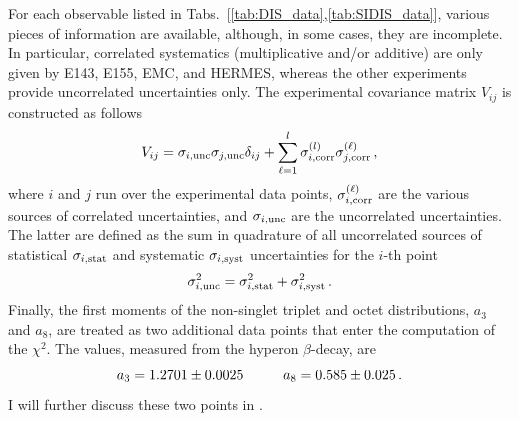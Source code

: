 For each observable listed in Tabs.~[\ref{tab:DIS_data},\ref{tab:SIDIS_data}], various pieces of information are available, although, in some cases, they are incomplete. In particular, correlated systematics (multiplicative and/or additive) are only given by E143, E155, EMC, and HERMES, whereas the other experiments provide uncorrelated uncertainties only. The experimental covariance matrix $V_{ij}$ is constructed as follows
\begin{equation}
  V_{ij} =  \sigma_{i,\textrm{unc}} \sigma_{j,\textrm{unc}} \delta_{ij} + \sum_{\ell=1}^{l} \sigma_{i,\textrm{corr}}^{(l)} \sigma_{j,\textrm{corr}}^{(\ell)} \,,
  \label{eq:covariance_matrix}
\end{equation}
where $i$ and $j$ run over the experimental data points, $\sigma_{i,\textrm{corr}}^{(\ell)}$ are the various sources of correlated uncertainties, and $\sigma_{i,\textrm{unc}}$ are the uncorrelated uncertainties. The latter are defined as the sum in quadrature of all uncorrelated sources of statistical $\sigma_{i,\textrm{stat}}$ and systematic $\sigma_{i,\textrm{syst}}$ uncertainties for the $i$-th point
\begin{equation}
  \sigma_{i,\textrm{unc}}^2 = \sigma_{i,\textrm{stat}}^2 + \sigma_{i,\textrm{syst}}^2 \,.
\end{equation}
Finally, the first moments of the non-singlet triplet and octet distributions, $a_3$ and $a_8$, are treated as two additional data points that enter the computation of the $\chi^2$. The values, measured from the hyperon $\beta$-decay, are \cite{Nakamura_2010}
\begin{equation}
  a_3 = 1.2701 \pm 0.0025 \hspace{10mm} a_8 = 0.585 \pm 0.025 \,.
  \label{eq:a3_a8_values}
\end{equation}
I will further discuss these two points in .


